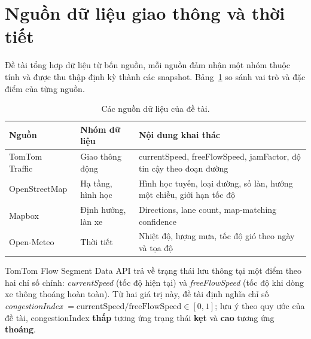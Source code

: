 \section{Nguồn dữ liệu giao thông và thời tiết}
Đề tài tổng hợp dữ liệu từ bốn nguồn, mỗi nguồn đảm nhận một nhóm thuộc tính và được thu thập định kỳ thành các snapshot. Bảng~\ref{tab:sources} so sánh vai trò và đặc điểm của từng nguồn.

\begin{table}[h!]
\centering
\caption{Các nguồn dữ liệu của đề tài.}
\label{tab:sources}
\small
\begin{tabularx}{\textwidth}{llX}
\toprule
\textbf{Nguồn} & \textbf{Nhóm dữ liệu} & \textbf{Nội dung khai thác}\\
\midrule
TomTom Traffic~\cite{tomtom} & Giao thông động & currentSpeed, freeFlowSpeed, jamFactor, độ tin cậy theo đoạn đường\\
OpenStreetMap~\cite{osm} & Hạ tầng, hình học & Hình học tuyến, loại đường, số làn, hướng một chiều, giới hạn tốc độ\\
Mapbox & Định hướng, làn xe & Directions, lane count, map-matching confidence\\
Open-Meteo~\cite{openmeteo} & Thời tiết & Nhiệt độ, lượng mưa, tốc độ gió theo ngày và tọa độ\\
\bottomrule
\end{tabularx}
\end{table}

TomTom Flow Segment Data API trả về trạng thái lưu thông tại một điểm theo hai chỉ số chính: \textit{currentSpeed} (tốc độ hiện tại) và \textit{freeFlowSpeed} (tốc độ khi dòng xe thông thoáng hoàn toàn). Từ hai giá trị này, đề tài định nghĩa chỉ số \textit{congestionIndex} $= \text{currentSpeed} / \text{freeFlowSpeed} \in [0,1]$; lưu ý theo quy ước của đề tài, congestionIndex \textbf{thấp} tương ứng trạng thái \textbf{kẹt} và \textbf{cao} tương ứng \textbf{thoáng}.

